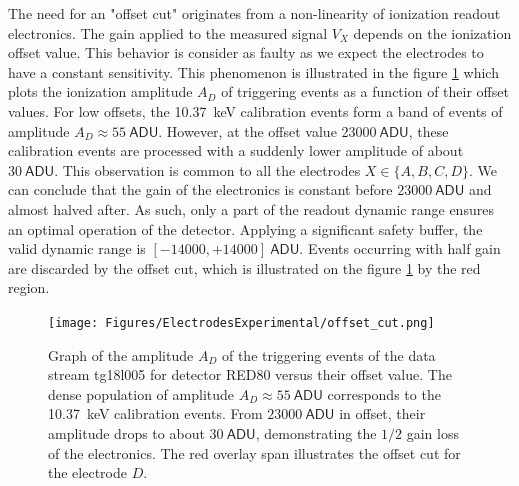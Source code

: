 The need for an "offset cut" originates from a non-linearity of ionization readout electronics. The gain applied to the measured signal $V_X$ depends on the ionization offset value. This behavior is consider as faulty as we expect the electrodes to have a constant sensitivity. This phenomenon is illustrated in the figure \ref{fig:offset-problem} which plots the ionization amplitude $A_D$ of triggering events as a function of their offset values. For low offsets, the \SI{10.37}{\kilo\eV} calibration events form a band of events of amplitude $A_{D} \approx \SI{55}{\textsf{ADU}}$. However, at the offset value $\SI{23000}{\textsf{ADU}}$, these calibration events are processed with a suddenly lower amplitude of about $\SI{30}{\textsf{ADU}}$. This observation is common to all the electrodes $X \in \{ A,B,C,D \}$. We can conclude that the gain of the electronics is constant before $\SI{23000}{\textsf{ADU}}$ and almost halved after. As such, only a part of the readout dynamic range ensures an optimal operation of the detector. Applying a significant safety buffer, the valid dynamic range is $[-14000, +14000]\ \textsf{ADU}$. Events occurring with half gain are discarded by the offset cut, which is illustrated on the figure \ref{fig:offset-problem} by the red region.

\begin{figure}
\centering
\texttt{[image: Figures/ElectrodesExperimental/offset\_cut.png]}
\caption{Graph of the amplitude $A_{D}$ of the triggering events of the data stream tg18l005 for detector RED80 versus their offset value. The dense population of amplitude $A_{D} \approx \SI{55}{\textsf{ADU}}$ corresponds to the \SI{10.37}{\kilo\eV} calibration events. From $\SI{23000}{\textsf{ADU}}$ in offset, their amplitude drops to about $\SI{30}{\textsf{ADU}}$, demonstrating the  $1/2$ gain loss of the electronics. The red overlay span illustrates the offset cut for the electrode $D$.}
\label{fig:offset-problem}
\end{figure}


